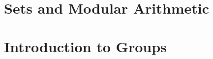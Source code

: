 \documentclass[10pt,oneside]{book}
\begin{document}

{\let\clearpage\relax \tableofcontents} 
\newpage


\chapter{Sets and Modular Arithmetic}


\chapter{Introduction to Groups}

\end{document}
